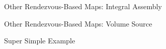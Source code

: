 \documentclass{beamer}
\begin{document}
\begin{frame}{Other Rendezvous-Based Maps: Integral Assembly}

\end{frame}

\begin{frame}{Other Rendezvous-Based Maps: Volume Source}

\end{frame}

\begin{frame}{Super Simple Example}

\end{frame}

\end{document}
